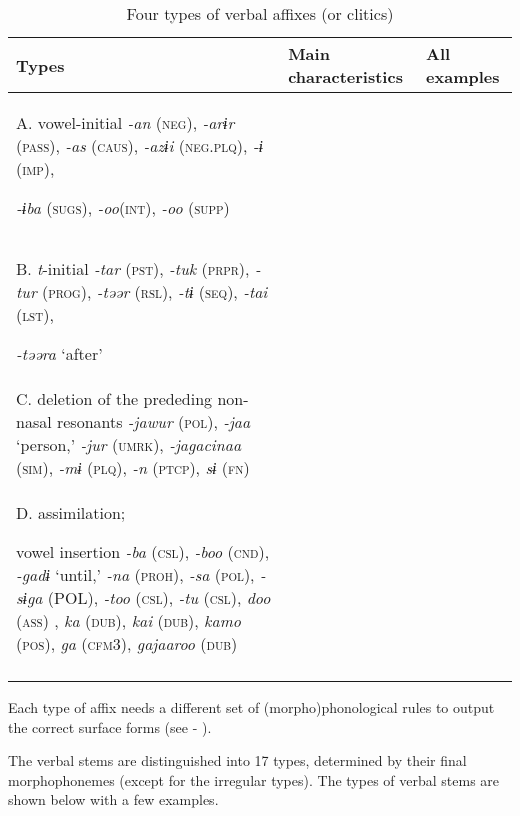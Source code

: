 \begin{table}
\caption{\label{tab:key:56}Four types of verbal affixes (or clitics)}
\begin{tabularx}{\textwidth}{Xll}
Types  & Main characteristics  & All examples\\
\midrule
A.  vowel-initial  \textit{-an} (\textsc{neg}), \textit{-arɨr} (\textsc{pass}), \textit{-as} (\textsc{caus}), \textit{-azɨi} (\textsc{neg}.\textsc{plq}), \textit{-ɨ} (\textsc{imp}),

\textit{-ɨba} (\textsc{sugs}), \textit{-oo}(\textsc{int}), \textit{-oo} (\textsc{supp})
\\
\tablevspace

B.  \textit{t}-initial  \textit{-tar} (\textsc{pst}), \textit{-tuk} (\textsc{prpr}), \textit{-tur} (\textsc{prog}), \textit{-təər} (\textsc{rsl}), \textit{-tɨ} (\textsc{seq}), \textit{-tai} (\textsc{lst}),

\textit{-təəra} ‘after’\\

\tablevspace

C.  deletion of the prededing non-nasal resonants  \textit{-jawur} (\textsc{pol}), \textit{-jaa} ‘person,’ \textit{-jur} (\textsc{umrk}), \textit{-jagacinaa} (\textsc{sim}), \textit{-mɨ} (\textsc{plq}), \textit{-n} (\textsc{ptcp}), \textit{sɨ} (\textsc{fn})\\

\tablevspace
D.  assimilation;

vowel insertion  \textit{-ba} (\textsc{csl}), \textit{-boo} (\textsc{cnd}), \textit{-gadɨ} ‘until,’ \textit{-na} (\textsc{proh}), \textit{-sa} (\textsc{pol}), \textit{-sɨga} (POL), \textit{-too} (\textsc{csl}), \textit{-tu} (\textsc{csl}), \textit{doo} (\textsc{ass}) , \textit{ka} (\textsc{dub}), \textit{kai} (\textsc{dub}), \textit{kamo} (\textsc{pos}), \textit{ga} (\textsc{cfm3}), \textit{gajaaroo} (\textsc{dub})\\
\lspbottomrule
\end{tabularx}
\end{table}

Each type of affix needs a different set of (morpho)phonological rules to output the correct surface forms (see  - ).

The verbal stems are distinguished into 17 types, determined by their final morphophonemes (except for the irregular types). The types of verbal stems are shown below with a few examples.

